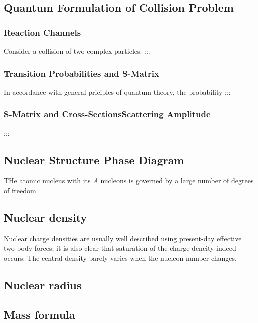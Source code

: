 \subsection{Quantum Formulation of Collision Problem}

\subsubsection{Reaction Channels}

Consider a collision of two complex particles. ::: \cite{iljinov94}

\subsubsection{Transition Probabilities and S-Matrix}

In accordance with general priciples of quantum theory, the probability 
 ::: \cite{iljinov94}

\subsubsection{S-Matrix and Cross-SectionsScattering Amplitude}

 ::: \cite{iljinov94}


\subsection{Nuclear Structure Phase Diagram}

THe atomic nucleus with its $A$ nucleons is governed by a large number of degrees of freedom.

\subsection{Nuclear density}

Nuclear charge densities are usually well described using present-day effective two-body forces; it is also clear that saturation of the charge dencity indeed occurs. 
The central density barely varies when the nucleon number changes.
\subsection{Nuclear radius}

\subsection{Mass formula}

